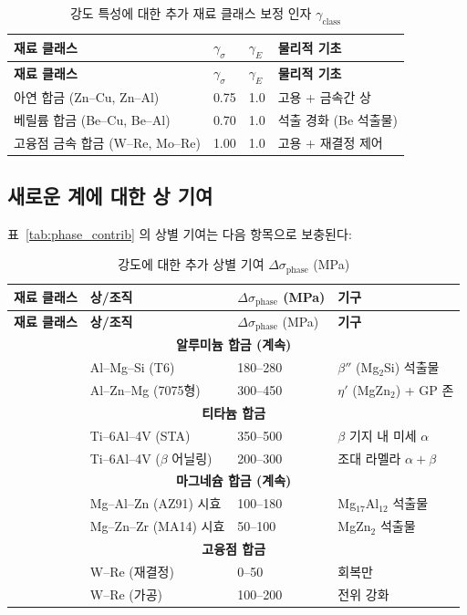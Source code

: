 \documentclass[12pt,a4paper]{article}
\begin{document}
	\begin{longtable}{p{3.5cm} p{2.5cm} p{2.5cm} p{5cm}}
		\caption{강도 특성에 대한 추가 재료 클래스 보정 인자 $\gamma_{\text{class}}$}\label{tab:gamma_class_extended}\\
		\toprule
		\textbf{재료 클래스} & $\gamma_{\sigma}$ & $\gamma_{E}$ & \textbf{물리적 기초} \\
		\midrule
		\endfirsthead
		\toprule
		\textbf{재료 클래스} & $\gamma_{\sigma}$ & $\gamma_{E}$ & \textbf{물리적 기초} \\
		\midrule
		\endhead
		아연 합금 (Zn–Cu, Zn–Al) & 0.75 & 1.0 & 고용 + 금속간 상 \\
		베릴륨 합금 (Be–Cu, Be–Al) & 0.70 & 1.0 & 석출 경화 (Be 석출물) \\
		고융점 금속 합금 (W–Re, Mo–Re) & 1.00 & 1.0 & 고용 + 재결정 제어 \\
		\bottomrule
	\end{longtable}
	
	\subsection*{새로운 계에 대한 상 기여}
	표~\ref{tab:phase_contrib} 의 상별 기여는 다음 항목으로 보충된다:
	
	\begin{longtable}{p{3.5cm} p{3.0cm} p{3.0cm} p{4cm}}
		\caption{강도에 대한 추가 상별 기여 $\Delta\sigma_{\text{phase}}$ (MPa)}\label{tab:phase_contrib_extended}\\
		\toprule
		\textbf{재료 클래스} & \textbf{상/조직} & $\Delta\sigma_{\text{phase}}$ (MPa) & \textbf{기구} \\
		\midrule
		\endfirsthead
		\toprule
		\textbf{재료 클래스} & \textbf{상/조직} & $\Delta\sigma_{\text{phase}}$ (MPa) & \textbf{기구} \\
		\midrule
		\endhead
		\multicolumn{4}{c}{\textbf{알루미늄 합금 (계속)}} \\
		& Al–Mg–Si (T6) & 180–280 & $\beta''$ (Mg$_2$Si) 석출물 \\
		& Al–Zn–Mg (7075형) & 300–450 & $\eta'$ (MgZn$_2$) + GP 존 \\
		\hline
		\multicolumn{4}{c}{\textbf{티타늄 합금}} \\
		& Ti–6Al–4V (STA) & 350–500 & $\beta$ 기지 내 미세 $\alpha$ \\
		& Ti–6Al–4V ($\beta$ 어닐링) & 200–300 & 조대 라멜라 $\alpha+\beta$ \\
		\hline
		\multicolumn{4}{c}{\textbf{마그네슘 합금 (계속)}} \\
		& Mg–Al–Zn (AZ91) 시효 & 100–180 & Mg$_{17}$Al$_{12}$ 석출물 \\
		& Mg–Zn–Zr (MA14) 시효 & 50–100 & MgZn$_2$ 석출물 \\
		\hline
		\multicolumn{4}{c}{\textbf{고융점 합금}} \\
		& W–Re (재결정) & 0–50 & 회복만 \\
		& W–Re (가공) & 100–200 & 전위 강화 \\
		\bottomrule
	\end{longtable}
	
\end{document}
